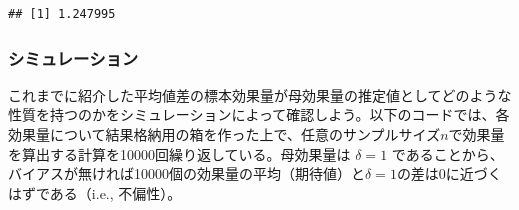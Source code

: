 \documentclass[
  ja=standard, xelatex, base=12pt]{bxjsreport}
\begin{document}
\begin{verbatim}
## [1] 1.247995
\end{verbatim}

\hypertarget{ux30b7ux30dfux30e5ux30ecux30fcux30b7ux30e7ux30f3}{%
\subsubsection{シミュレーション}\label{ux30b7ux30dfux30e5ux30ecux30fcux30b7ux30e7ux30f3}}

これまでに紹介した平均値差の標本効果量が母効果量の推定値としてどのような性質を持つのかをシミュレーションによって確認しよう。以下のコードでは、各効果量について結果格納用の箱を作った上で、任意のサンプルサイズ\(n\)で効果量を算出する計算を10000回繰り返している。母効果量は \(\delta=1\) であることから、バイアスが無ければ10000個の効果量の平均（期待値）と\(\delta=1\)の差は0に近づくはずである（i.e., 不偏性）。
\end{document}
